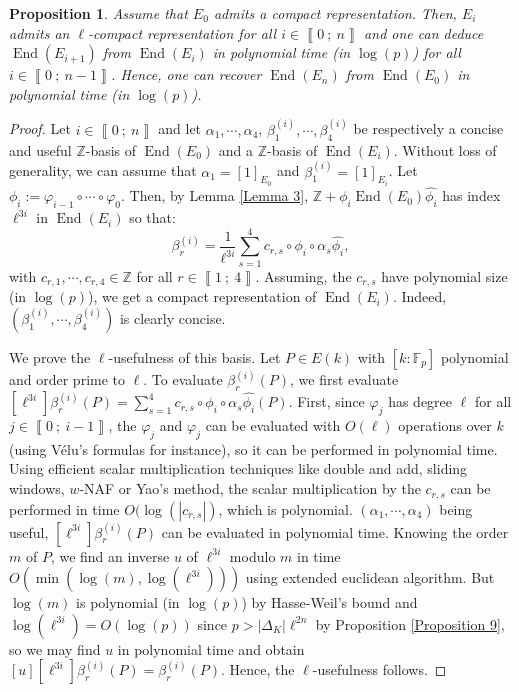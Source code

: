 \documentclass[a4paper,10pt]{report}
\theoremstyle{definition}
\theoremstyle{plain}
\newtheorem{Proposition}[Definition]{Proposition}
\theoremstyle{definition}
\newcommand{\Z}{\mathbb{Z}}
\newcommand{\F}{\mathbb{F}}
\renewcommand{\i}[2]{\left\llbracket #1~;~#2\right\rrbracket}
\renewcommand{\(}{\left(}
\renewcommand{\)}{\right)}
\DeclareMathOperator{\End}{End}
\begin{document}
\begin{Proposition}
Assume that $E_0$ admits a compact representation.  Then, $E_i$ admits an $\ell$-compact representation for all $i\in\i{0}{n}$ and one can deduce $\End(E_{i+1})$ from $\End(E_i)$ in polynomial time (in $\log(p)$) for all $i\in\i{0}{n-1}$. Hence, one can recover $\End(E_n)$ from $\End(E_0)$ in polynomial time (in $\log(p)$).
\end{Proposition}

\begin{proof}
Let $i\in\i{0}{n}$ and let $\alpha_1,\cdots,\alpha_4$, $\beta_1^{(i)},\cdots,\beta_4^{(i)}$ be respectively a concise and useful $\Z$-basis of $\End(E_0)$ and a $\Z$-basis of $\End(E_i)$. Without loss of generality, we can assume that $\alpha_1=[1]_{E_0}$ and $\beta_1^{(i)}=[1]_{E_i}$. Let $\phi_i:=\varphi_{i-1}\circ\cdots\circ\varphi_0$. Then, by Lemma \ref{Lemma 3}, $\Z+\phi_i\End(E_0)\widehat{\phi_i}$ has index $\ell^{3i}$ in $\End(E_i)$ so that:
\[\beta_r^{(i)}=\frac{1}{\ell^{3i}}\sum_{s=1}^4 c_{r,s}\circ \phi_i\circ \alpha_s\widehat{\phi_i},\]
with $c_{r,1},\cdots,c_{r,4}\in\Z$ for all $r\in\i{1}{4}$.  Assuming, the $c_{r,s}$ have polynomial size (in $\log(p)$), we get a compact representation of $\End(E_i)$. Indeed,  $(\beta_1^{(i)},\cdots,\beta_4^{(i)})$ is clearly concise.  

We prove the $\ell$-usefulness of this basis. Let $P\in E(k)$ with $[k:\F_p]$ polynomial and order prime to $\ell$.  To evaluate $\beta_r^{(i)}(P)$, we first evaluate $[\ell^{3i}]\beta_r^{(i)}(P)=\sum_{s=1}^4 c_{r,s}\circ \phi_i\circ \alpha_s\widehat{\phi_i}(P)$.  First, since $\varphi_j$ has degree $\ell$ for all $j\in\i{0}{i-1}$, the $\varphi_j$ and $\widehat{\varphi_j}$ can be evaluated with $O(\ell)$ operations over $k$ (using V\'{e}lu's formulas \cite{Velu} for instance), so it can be performed in polynomial time.  Using efficient scalar multiplication techniques like double and add,  sliding windows, $w$-NAF or Yao's method, the scalar multiplication by the $c_{r,s}$ can be performed in time $O(\log(|c_{r,s}|)$, which is polynomial. $(\alpha_1,\cdots,\alpha_4)$ being useful, $[\ell^{3i}]\beta_r^{(i)}(P)$ can be evaluated in polynomial time. Knowing the order $m$ of $P$, we find an inverse $u$ of $\ell^{3i}$ modulo $m$ in time $O(\min(\log(m),\log(\ell^{3i})))$ using extended euclidean algorithm. But $\log(m)$ is polynomial (in $\log(p)$) by Hasse-Weil's bound and $\log(\ell^{3i})=O(\log(p))$ since $p>|\Delta_K|\ell^{2n}$ by Proposition \ref{Proposition 9}, so we may find $u$ in polynomial time and obtain $[u][\ell^{3i}]\beta_r^{(i)}(P)=\beta_r^{(i)}(P)$.  Hence, the $\ell$-usefulness follows.


\end{proof}
\end{document}
